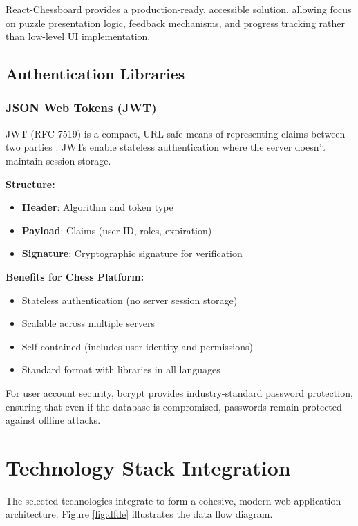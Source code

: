 React-Chessboard provides a production-ready, accessible solution, allowing focus on puzzle presentation logic, feedback mechanisms, and progress tracking rather than low-level UI implementation.

\subsection*{Authentication Libraries}

\subsubsection*{JSON Web Tokens (JWT)}

JWT (RFC 7519) is a compact, URL-safe means of representing claims between two parties \cite{jones2015jwt}. JWTs enable stateless authentication where the server doesn't maintain session storage.

\textbf{Structure:}
\begin{itemize}
    \item \textbf{Header}: Algorithm and token type
    \item \textbf{Payload}: Claims (user ID, roles, expiration)
    \item \textbf{Signature}: Cryptographic signature for verification
\end{itemize}

\textbf{Benefits for Chess Platform:}
\begin{itemize}
    \item Stateless authentication (no server session storage)
    \item Scalable across multiple servers
    \item Self-contained (includes user identity and permissions)
    \item Standard format with libraries in all languages
\end{itemize}

For user account security, bcrypt provides industry-standard password protection, ensuring that even if the database is compromised, passwords remain protected against offline attacks.

\section{Technology Stack Integration}

The selected technologies integrate to form a cohesive, modern web application architecture. Figure \ref{fig:dfde} illustrates the data flow diagram.

